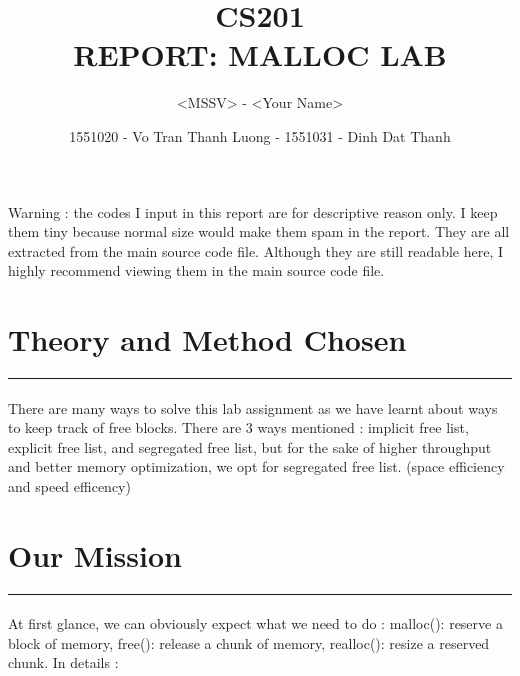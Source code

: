 \documentclass[a4paper]{article}
\begin{document}
\title{CS201\\REPORT: MALLOC LAB}

\author{<MSSV> - <Your Name>}
\author{1551020 - Vo Tran Thanh Luong - 1551031 - Dinh Dat Thanh}
\maketitle


\setcounter{page}{1}
\tableofcontents
{}

\clearpage


\begin{displayquote}

Warning : the codes I input in this report are for descriptive reason only. I keep them tiny because normal size would make them spam in the report.  They are all extracted from the main source code file. Although they are still readable here, I highly recommend viewing them in the main source code file.
\end{displayquote}

\section{Theory and Method Chosen}
\noindent\rule{2cm}{0.4pt}
\paragraph{}  

There are many ways to solve this lab assignment as we have learnt about ways to keep track of free blocks. There are 3 ways mentioned : implicit free list, explicit free list, and segregated free list, but for the sake of higher throughput and better memory optimization, we opt for segregated free list.  (space efficiency and speed efficency)

\section{Our Mission}
\noindent\rule{2cm}{0.4pt}
\paragraph{}  
At first glance, we can obviously expect what we need to do : malloc():  reserve a block of memory, free():  release a chunk of memory, realloc():  resize a reserved chunk. In details :
\newline  
\end{document}
